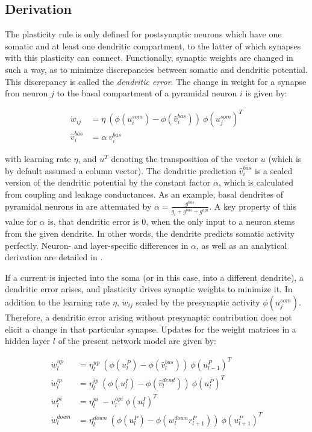\subsection{Derivation}

The plasticity rule is only defined for postsynaptic neurons which have one somatic and at least one dendritic
compartment, to the latter of which synapses with this plasticity can connect. Functionally, synaptic weights are 
changed in such a way, as to minimize discrepancies between somatic and dendritic potential. This discrepancy is called
the \textit{dendritic error}. The change in
weight for a synapse fron neuron $j$ to the basal compartment of a pyramidal neuron $i$ is given by:

\begin{align}
  \dot{w}_{ij}    & = \eta \ ( \phi(u_i^{som}) - \phi(\hat{v}_i^{bas}) ) \ \phi(u_j^{som})^T \\
  \hat{v}_i^{bas} & = \alpha \  v_i^{bas}
\end{align}

with learning rate $\eta$, and $u^T$ denoting the transposition of the vector $u$ (which is by default assumed a column
vector). The dendritic prediction $\hat{v}_i^{bas}$ is a scaled version of the dendritic potential by the constant
factor $\alpha$, which is calculated from coupling and leakage conductances. As an example, basal dendrites of pyramidal
neurons in \cite{sacramento2018dendritic} are attenuated by $\alpha = \frac{g^{bas}}{g_l + g^{bas} + g^{api}}$. A key
property of this value for $\alpha$ is, that dendritic error is $0$, when the only input to a neuron stems from the
given dendrite. In other words, the dendrite predicts somatic activity perfectly. Neuron- and layer-specific
differences in $\alpha$, as well as an analytical derivation are detailed in \citep{sacramento2018dendritic}.

If a current is injected into the soma (or in this case, into a different dendrite), a dendritic error arises, and 
plasticity drives synaptic weights to minimize it. In addition to the learning rate $\eta$, $\dot{w}_{ij}$ scaled by the
presynaptic activity $\phi(u_j^{som})$. Therefore, a dendritic error arising without presynaptic contribution does not elicit a 
change in that particular synapse.  
Updates for the weight matrices in a hidden layer $l$ of the present
network model are given by:

\begin{align}
  \dot{w}_{l}^{up}   & = \eta_l^{up} \ ( \phi(u_l^{P}) - \phi(\hat{v}_l^{bas}) ) \ \phi(u_{l-1}^{P})^T\label{eq-delta_w_up}         \\
  \dot{w}_{l}^{ip}   & = \eta_l^{ip} \ ( \phi(u_l^{I}) - \phi(\hat{v}_l^{dend}) ) \ \phi(u_{l}^{P})^T\label{eq-delta_w_ip}          \\
  \dot{w}_{l}^{pi}   & = \eta_l^{pi} \ - v_l^{api} \ \phi(u_l^{I})^T\label{eq-delta_w_pi}                                           \\
  \dot{w}_{l}^{down} & = \eta_l^{down} \ ( \phi(u_l^{P}) - \phi(w_l^{down} r_{l+1}^P) )\ \phi(u_{l+1}^{P})^T\label{eq-delta_w_down}
\end{align}

